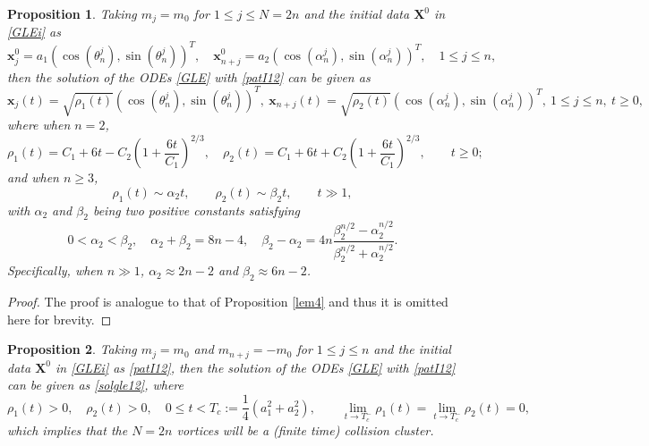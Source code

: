 \documentclass{aims}
\theoremstyle{plain}
\newtheorem{proposition}{Proposition}[section]
\theoremstyle{definition}
\newcommand{\bX}{{\mathbf X}}
\newcommand{\be} {\begin{equation}}
\newcommand{\ee}{\end{equation}}
\begin{document}
\begin{proposition}\label{lem7}
Taking $m_j=m_0$  for $1\le j\le N=2n$ and
the initial data $\bX^0$ in \eqref{GLEi} as
\be\label{patI12}
\mathbf x_j^0=a_1\left(\cos(\theta_n^j),\sin(\theta_n^j)\right)^T,\quad
\mathbf x_{n+j}^0=a_2\left(\cos(\alpha_n^j),\sin(\alpha_n^j)\right)^T,
\quad 1\le j\le n,
\ee
then the solution of the ODEs \eqref{GLE} with \eqref{patI12} can be given as
\be\label{solgle12}
\mathbf x_j(t)=\sqrt{\rho_1(t)}\left(\cos(\theta_n^j),\sin(\theta_n^j)\right)^T,\
\mathbf x_{n+j}(t)=\sqrt{\rho_2(t)}\left(\cos(\alpha_n^j),\sin(\alpha_n^j)\right)^T,
\   1\le j\le n,\   t\ge0,
\ee
where when $n=2$,
\be
\rho_1(t)=C_1+6t-C_2\left(
1+\frac{6t}{C_1}\right)^{2/3},\quad \rho_2(t)=C_1+6t+C_2\left(
1+\frac{6t}{C_1}\right)^{2/3}, \qquad t\ge0; \nonumber
\ee
and when $n\ge3$,
\be
\rho_1(t)\sim \alpha_2 t, \qquad \rho_2(t)\sim \beta_2 t, \qquad t\gg1, \nonumber
\ee
with $\alpha_2$ and $\beta_2$ being two positive constants satisfying
\begin{equation*}
0<\alpha_2< \beta_2, \quad
\alpha_2+\beta_2=8n-4,\quad
\beta_2-\alpha_2=4n\frac{\beta_2^{n/2}-\alpha_2^{n/2}}
{\beta_2^{n/2}+\alpha_2^{n/2}}.
\end{equation*}
Specifically,  when $n\gg1$, $\alpha_2\approx 2n-2$ and $\beta_2\approx 6n-2$.
\end{proposition}

\begin{proof}
The proof is analogue to that of Proposition \ref{lem4} and thus it is
omitted here for brevity.
\end{proof}

\begin{proposition}\label{th31}
Taking $m_j=m_0$ and $m_{n+j}=-m_0$ for $1\le j\le n$ and
the initial data $\bX^0$ in \eqref{GLEi} as
\eqref{patI12},
then the solution of the ODEs \eqref{GLE} with \eqref{patI12} can be given as
\eqref{solgle12},
where
\be
\rho_1(t)>0, \quad \rho_2(t)>0, \quad 0\le t<T_c:=\frac{1}{4}(a_1^2+a_2^2), \qquad \lim_{t\to T_c^-}\rho_1(t)=\lim_{t\to T_c^-}\rho_2(t)=0, \nonumber
\ee
which implies that the $N=2n$ vortices will be a (finite time) collision cluster.
\end{proposition}
\end{document}
